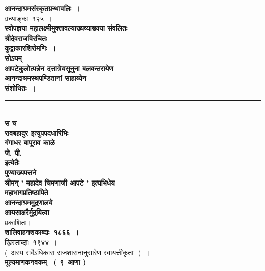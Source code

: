 \documentclass[11pt, openany]{book}
\begin{document}
\thispagestyle{empty}
\begin{center}
\vspace{2cm}
{\huge \textbf{आनन्दाश्रमसंस्कृतग्रन्थावलिः~।}}\\
{\large ग्रन्थाङ्कः~१२५~।\\}
{\vspace{2mm}}
\textbf{स्वोपज्ञया महालक्ष्मीमुक्तावल्याख्यव्याख्यया संवलितः\\}
{\vspace{2mm}}
\textbf{श्रीदेवराजविरचितः }\\
\textbf{\Huge
कुट्टाकारशिरोमणिः~।}\\
{\vspace{2mm}}
\textbf{सोऽयम्}\\
{\vspace{2mm}}
\textbf{आपटेकुलोत्पन्नेन दत्तात्रेयसूनुना बलवन्तरायेण\\
आनन्दाश्रमस्थपण्डितानां साहाय्येन\\
संशोधितः~।\\}
{\vspace{2mm}}
\rule{0.2\linewidth}{1.0pt}\\
{\vspace{2mm}}
\textbf{स च\\
रावबहादुर इत्युपपदधारिभिः\\}
{\vspace{2mm}}
\textbf{\Huge गंगाधर बापूराव काळे}\\
\textbf{जे. पी.\\
इत्येतैः\\
पुण्याख्यपत्तने\\
श्रीमन् ' महादेव चिमणाजी आपटे ' इत्यभिधेय \textendash\\
महाभागप्रतिष्ठापिते\\}
{\vspace{2mm}}
{\Huge \textbf{आनन्दाश्रममुद्रणालये}}\\
{\vspace{2mm}}
\textbf{आयसाक्षरैर्मुद्रयित्वा\\}
{\vspace{2mm}}
प्रकाशितः।\\
{\vspace{2mm}}
\textbf{शालिवाहनशकाब्दाः~१८६६~।}\\
{\vspace{2mm}}
ख्रिस्ताब्दाः~१९४४~।\\
{\vspace{2mm}}
(~अस्य सर्वेऽधिकारा राजशासनानुसारेण स्वायत्तीकृताः~)~।\\
{\vspace{2mm}}
{\large \textbf{मूल्यमाणकनवकम्~ ( ९~आणा )}}
\end{center}
\end{document}
